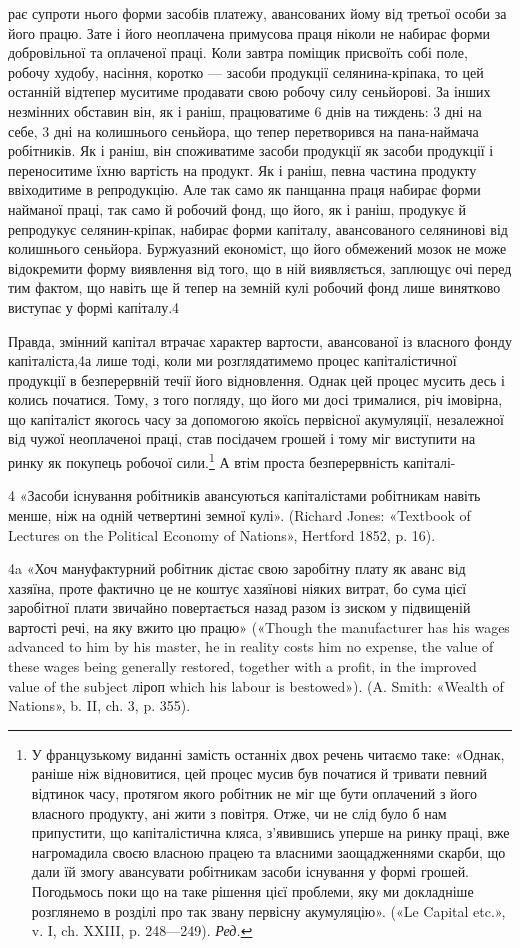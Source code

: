 рає супроти нього форми засобів платежу, авансованих йому
від третьої особи за його працю. Зате і його неоплачена примусова
праця ніколи не набирає форми добровільної та оплаченої
праці. Коли завтра поміщик присвоїть собі поле, робочу худобу,
насіння, коротко — засоби продукції селянина-кріпака,
то цей останній відтепер муситиме продавати свою робочу силу
сеньйорові. За інших незмінних обставин він, як і раніш, працюватиме
6 днів на тиждень: 3 дні на себе, 3 дні на колишнього
сеньйора, що тепер перетворився на пана-наймача робітників.
Як і раніш, він споживатиме засоби продукції як засоби продукції
і переноситиме їхню вартість на продукт. Як і раніш, певна
частина продукту ввіходитиме в репродукцію. Але так само як
панщанна праця набирає форми найманої праці, так само й робочий
фонд, що його, як і раніш, продукує й репродукує селянин-кріпак,
набирає форми капіталу, авансованого селянинові від
колишнього сеньйора. Буржуазний економіст, що його обмежений
мозок не може відокремити форму виявлення від того, що
в ній виявляється, заплющує очі перед тим фактом, що навіть
ще й тепер на земній кулі робочий фонд лише винятково виступає
у формі капіталу.4

Правда, змінний капітал втрачає характер вартости, авансованої
із власного фонду капіталіста,4а лише тоді, коли ми розглядатимемо
процес капіталістичної продукції в безперервній течії
його відновлення. Однак цей процес мусить десь і колись початися.
Тому, з того погляду, що його ми досі трималися, річ
імовірна, що капіталіст якогось часу за допомогою якоїсь первісної
акумуляції, незалежної від чужої неоплаченоі праці,
став посідачем грошей і тому міг виступити на ринку як
покупець робочої сили.\footnote*{
У французькому виданні замість останніх двох речень читаємо
таке: «Однак, раніше ніж відновитися, цей процес мусив був початися
й тривати певний відтинок часу, протягом якого робітник не міг ще бути
оплачений з його власного продукту, ані жити з повітря. Отже, чи не слід
було б нам припустити, що капіталістична кляса, з’явившись уперше
на ринку праці, вже нагромадила своєю власною працею та власними
заощадженнями скарби, що дали їй змогу авансувати робітникам засоби
існування у формі грошей. Погодьмось поки що на таке рішення цієї
проблеми, яку ми докладніше розглянемо в розділі про так звану первісну
акумуляцію». («Le Capital etc.», v. I, ch. XXIII, p. 248—249). \emph{Ред.}
} А втім проста безперервність капіталі-

4 «Засоби існування робітників авансуються капіталістами робітникам
навіть менше, ніж на одній четвертині земної кулі». (Richard
Jones: «Textbook of Lectures on the Political Economy of Nations», Hertford
1852, p. 16).

4a «Хоч мануфактурний робітник дістає свою заробітну плату як
аванс від хазяїна, проте фактично це не коштує хазяїнові ніяких витрат,
бо сума цієї заробітної плати звичайно повертається назад разом із зиском
у підвищеній вартості речі, на яку вжито цю працю» («Though the
manufacturer has his wages advanced to him by his master, he in reality
costs him no expense, the value of these wages being generally restored,
together with a profit, in the improved value of the subject ліроп
which his labour is bestowed»). (A. Smith: «Wealth of Nations», b. II,
ch. 3, p. 355).